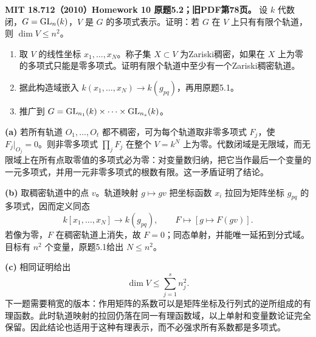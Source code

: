 \begin{exercise}\label{hw:5.2}
\textbf{MIT 18.712（2010）Homework 10 原题5.2；旧PDF第78页。}
设 $k$ 代数闭，$G=\operatorname{GL}_n(k)$，$V$ 是 $G$ 的多项式表示。证明：若 $G$ 在 $V$ 上只有有限个轨道，则 $\dim V\le n^2$。
\begin{enumerate}[label=(\alph*)]
\item 取 $V$ 的线性坐标 $x_1,\ldots,x_N$。称子集 $X\subset V$ 为Zariski稠密，如果在 $X$ 上为零的多项式只能是零多项式。证明有限个轨道中至少有一个Zariski稠密轨道。
\item 据此构造域嵌入 $k(x_1,\ldots,x_N)\to k(g_{pq})$，再用原题5.1。
\item 推广到 $G=\operatorname{GL}_{n_1}(k)\times\cdots\times\operatorname{GL}_{n_s}(k)$。
\end{enumerate}
\end{exercise}
\begin{solution}
\textbf{(a)} 若所有轨道 $O_1,\ldots,O_t$ 都不稠密，可为每个轨道取非零多项式 $F_j$，使 $F_j|_{O_j}=0$。则非零多项式 $\prod_jF_j$ 在整个 $V=k^N$ 上为零。代数闭域是无限域，而无限域上在所有点取零值的多项式必为零：对变量数归纳，把它当作最后一个变量的一元多项式，并用一元非零多项式的根数有限。这一矛盾证明了结论。

\textbf{(b)} 取稠密轨道中的点 $v$。轨道映射 $g\mapsto gv$ 把坐标函数 $x_i$ 拉回为矩阵坐标 $g_{pq}$ 的多项式，因而定义同态
\[
 k[x_1,\ldots,x_N]\longrightarrow k(g_{pq}),\qquad F\longmapsto[g\mapsto F(gv)].
\]
若像为零，$F$ 在稠密轨道上消失，故 $F=0$；同态单射，并能唯一延拓到分式域。目标有 $n^2$ 个变量，原题5.1给出 $N\le n^2$。

\textbf{(c)} 相同证明给出
\[
 \boxed{\dim V\le\sum_{j=1}^s n_j^2.}
\]
下一题需要稍宽的版本：作用矩阵的系数可以是矩阵坐标及行列式的逆所组成的有理函数。此时轨道映射的拉回仍落在同一有理函数域，以上单射和变量数论证完全保留。因此结论也适用于这种有理表示，而不必强求所有系数都是多项式。
\end{solution}

